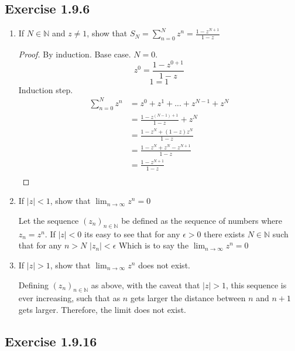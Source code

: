 \documentclass{tufte-book}
\theoremstyle{mytheoremstyle}
\theoremstyle{mylemstyle}
\theoremstyle{mydefstyle}
\begin{document}
\subsection{Exercise 1.9.6}
\begin{enumerate}

\item If $N \in \mathbb{N}$ and $z \neq 1$, show that $S_N = \sum_{n=0}^{N}z^n = \frac{1-z^{N+1}}{1-z}$

\begin{proof}By induction.
Base case. $N=0$.
\[z^0 = \frac{1-z^{0+1}}{1-z}\]
\[1 = 1\]
Induction step.  
\begin{align*}
\sum_{n=0}^{N}z^n &= z^0+z^1+...+z^{N-1} + z^{N}\\
 &= \frac{1-z^{(N-1)+1}}{1-z} + z^{N}\\
 &= \frac{1-z^{N} + (1-z)z^{N}}{1-z}\\
 &= \frac{1-z^{N} + z^{N} - z^{N+1}}{1-z}\\
 &= \frac{1-z^{N+1}}{1-z}\\
\end{align*}
\end{proof}

\item If $|z| < 1$, show that $\lim_{n \rightarrow \infty}z^n =0$

Let the sequence $(z_n)_{n \in \mathbb{N}}$ be defined as the sequence of numbers where $z_n = z^n$.  If $|z| < 0$ its easy to see that for any $\epsilon > 0$ there exists $N \in \mathbb{N}$ such that for any $n > N$ $|z_n| < \epsilon$ Which is to say the $\lim_{n \rightarrow \infty}z^n =0$

\item If $|z| > 1$, show that $\lim_{n \rightarrow \infty}z^n$ does not exist.

Defining $(z_n)_{n \in \mathbb{N}}$ as above, with the caveat that $|z| > 1$, this sequence is ever increasing, such that as $n$ gets larger the distance between $n$ and $n+1$ gets larger.  Therefore, the limit does not exist.

\end{enumerate}

\subsection{Exercise 1.9.16}
\end{document}
